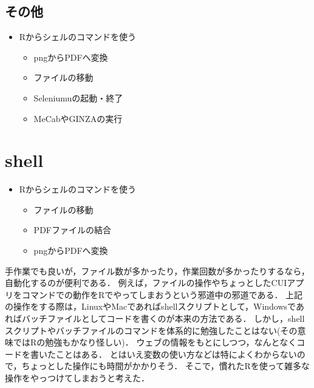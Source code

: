 \documentclass[
]{article}
\providecommand{\tightlist}{%
  \setlength{\itemsep}{0pt}\setlength{\parskip}{0pt}}
\begin{document}
\hypertarget{ux305dux306eux4ed6}{%
\subsection{その他}\label{ux305dux306eux4ed6}}

\begin{itemize}
\tightlist
\item
  Rからシェルのコマンドを使う

  \begin{itemize}
  \tightlist
  \item
    pngからPDFへ変換\\
  \item
    ファイルの移動\\
  \item
    Seleniumuの起動・終了\\
  \item
    MeCabやGINZAの実行
  \end{itemize}
\end{itemize}

\hypertarget{shell}{%
\section{shell}\label{shell}}

\begin{itemize}
\tightlist
\item
  Rからシェルのコマンドを使う

  \begin{itemize}
  \tightlist
  \item
    ファイルの移動\\
  \item
    PDFファイルの結合\\
  \item
    pngからPDFへ変換
  \end{itemize}
\end{itemize}

手作業でも良いが，ファイル数が多かったり，作業回数が多かったりするなら，自動化するのが便利である．
例えば，ファイルの操作やちょっとしたCUIアプリをコマンドでの動作をRでやってしまおうという邪道中の邪道である．
上記の操作をする際は，LinuxやMacであればshellスクリプトとして，Windowsであればバッチファイルとしてコードを書くのが本来の方法である．
しかし，shellスクリプトやバッチファイルのコマンドを体系的に勉強したことはない(その意味ではRの勉強もかなり怪しい)．
ウェブの情報をもとにしつつ，なんとなくコードを書いたことはある．
とはいえ変数の使い方などは特によくわからないので，ちょっとした操作にも時間がかかりそう．
そこで，慣れたRを使って雑多な操作をやっつけてしまおうと考えた．
\end{document}
